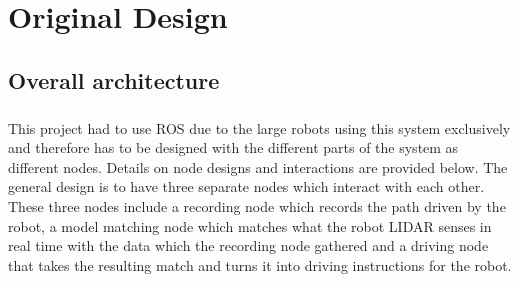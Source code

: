 \chapter{Original Design}





\section{Overall architecture}
\paragraph{}
This project had to use ROS\cite{ROS} due to the large robots using this system exclusively and therefore has to be designed with the different parts of the system as different nodes. Details on node designs and interactions are provided below. The general design is to have three separate nodes which interact with each other. These three nodes include a recording node which records the path driven by the robot, a model matching node which matches what the robot LIDAR senses in real time with the data which the recording node gathered and a driving node that takes the resulting match and turns it into driving instructions for the robot.
